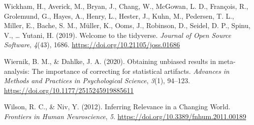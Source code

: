 \documentclass[
  man,
  floatsintext,
  longtable,
  nolmodern,
  notxfonts,
  notimes,
  mask,
  colorlinks=true,linkcolor=blue,citecolor=blue,urlcolor=blue]{apa7}
\newlength{\cslhangindent}
\newenvironment{CSLReferences}[2] %
 {\begin{list}{}{%
  \setlength{\itemindent}{0pt}
  \setlength{\leftmargin}{0pt}
  \setlength{\parsep}{0pt}
  \ifodd #1
   \setlength{\leftmargin}{\cslhangindent}
   \setlength{\itemindent}{-1\cslhangindent}
  \fi
  \setlength{\itemsep}{#2\baselineskip}}}
 {\end{list}}
\begin{document}
\begin{CSLReferences}{1}{0}
Wickham, H., Averick, M., Bryan, J., Chang, W., McGowan, L. D.,
François, R., Grolemund, G., Hayes, A., Henry, L., Hester, J., Kuhn, M.,
Pedersen, T. L., Miller, E., Bache, S. M., Müller, K., Ooms, J.,
Robinson, D., Seidel, D. P., Spinu, V., \ldots{} Yutani, H. (2019).
Welcome to the {tidyverse}. \emph{Journal of Open Source Software},
\emph{4}(43), 1686. \url{https://doi.org/10.21105/joss.01686}

Wiernik, B. M., \& Dahlke, J. A. (2020). Obtaining unbiased results in
meta-analysis: The importance of correcting for statistical artifacts.
\emph{Advances in Methods and Practices in Psychological Science},
\emph{3}(1), 94--123. \url{https://doi.org/10.1177/2515245919885611}

Wilson, R. C., \& Niv, Y. (2012). Inferring {Relevance} in a {Changing
World}. \emph{Frontiers in Human Neuroscience}, \emph{5}.
\url{https://doi.org/10.3389/fnhum.2011.00189}

\end{CSLReferences}
\end{document}
